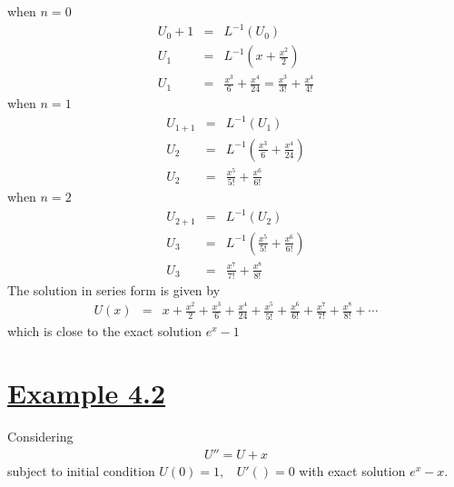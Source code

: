 \documentclass[11pt]{report}
\newcommand{\ubt}[1]{\textbf{\underline{#1}}}
\newcommand{\sps}{\\[0.2cm]}
\newcommand{\sprime}{'}
\newcommand{\dprime}{''}
\newcommand{\example}[1]{\section*{\ubt{Example #1}}}
\begin{document}
	when $n=0$
	\begin{eqnarray*}
		U_0+1&=& L^{-1}(U_0)\sps
		U_1 &=& L^{-1}\left(x + \frac{x^2}{2}\right)\sps
		U_1 &=& \frac{x^3}{6} + \frac{x^4}{24} = \frac{x^3}{3!} + \frac{x^4}{4!}
	\end{eqnarray*}
	when $n=1$
	\begin{eqnarray*}
		U_{1+1} &=& L^{-1}(U_1)\sps
		U_2 &=& L^{-1}\left(\frac{x^3}{6} + \frac{x^4}{24}\right)\sps
		U_2 &=& \frac{x^5}{5!} + \frac{x^6}{6!}
	\end{eqnarray*}
	when $n=2$
	\begin{eqnarray*}
		U_{2+1} &=& L^{-1}(U_2)\sps
		U_3 &=& L^{-1}\left(\frac{x^5}{5!} + \frac{x^6}{6!}\right)\sps
		U_3 &=&\frac{x^7}{7!} + \frac{x^8}{8!}
	\end{eqnarray*}
	The solution in series form is given by 
	\begin{eqnarray*}
		U(x)&=& x + \frac{x^2}{2}+\frac{x^3}{6} + \frac{x^4}{24} + \frac{x^5}{5!} + \frac{x^6}{6!} + \frac{x^7}{7!} + \frac{x^8}{8!}+ \cdots
	\end{eqnarray*}
	which is close to the exact solution $e^x - 1$

	\example{4.2}
	Considering 
	\begin{eqnarray}
		U\dprime = U + x \label{eq:4_9}
	\end{eqnarray}
	subject to initial condition $U(0) =1,~~~~ U\sprime()=0$ with exact solution $e^x - x$.
	
\end{document}
